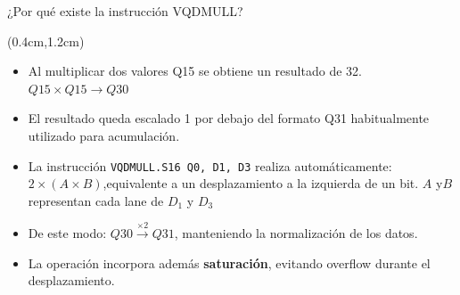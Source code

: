 \begin{frame}{¿Por qué existe la instrucción VQDMULL?}
 \begin{textblock*}{\textwidth}(0.4cm,1.2cm)
  \begin{tcolorbox}[enhanced jigsaw,rounded corners,drop fuzzy shadow=ShadowColor]
   \begin{itemize}[<+->]\justifying
    \item Al multiplicar dos valores Q15 se obtiene un resultado de \SI{32}{\bit}.\\
    $ Q15 \times Q15 \longrightarrow Q30$
    \item El resultado queda escalado \SI{1}{\bit} por debajo del formato Q31 habitualmente utilizado para acumulación.
    \item La instrucción \texttt{VQDMULL.S16 Q0, D1, D3} realiza automáticamente: $\boxed{2 \times (A \times B)}$,equivalente a un desplazamiento a la izquierda de un bit. $A$ y$B$ representan cada lane de $D_{1}$ y $D_{3}$
    \item De este modo: $Q30 \xrightarrow{\times 2} Q31$,  manteniendo la normalización de los datos.
    \item La operación incorpora además \textbf{saturación}, evitando overflow durante el desplazamiento.
   \end{itemize}
  \end{tcolorbox}
 \end{textblock*}
\end{frame}


